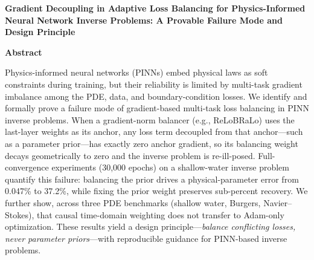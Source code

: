 \documentclass[11pt]{article}
\begin{document}
\begin{center}
{\Large\bfseries Gradient Decoupling in Adaptive Loss Balancing for Physics-Informed Neural Network Inverse Problems: A Provable Failure Mode and Design Principle}
\end{center}

\vspace{0.8cm}

\textbf{Abstract}

\vspace{0.3cm}

Physics-informed neural networks (PINNs) embed physical laws as soft constraints during training, but their reliability is limited by multi-task gradient imbalance among the PDE, data, and boundary-condition losses. We identify and formally prove a failure mode of gradient-based multi-task loss balancing in PINN inverse problems. When a gradient-norm balancer (e.g., ReLoBRaLo) uses the last-layer weights as its anchor, any loss term decoupled from that anchor---such as a parameter prior---has exactly zero anchor gradient, so its balancing weight decays geometrically to zero and the inverse problem is re-ill-posed. Full-convergence experiments (30,000 epochs) on a shallow-water inverse problem quantify this failure: balancing the prior drives a physical-parameter error from 0.047\% to 37.2\%, while fixing the prior weight preserves sub-percent recovery. We further show, across three PDE benchmarks (shallow water, Burgers, Navier--Stokes), that causal time-domain weighting does not transfer to Adam-only optimization. These results yield a design principle---\emph{balance conflicting losses, never parameter priors}---with reproducible guidance for PINN-based inverse problems.
\end{document}
